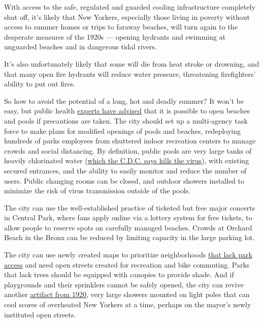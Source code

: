 With access to the safe, regulated and guarded cooling infrastructure
completely shut off, it's likely that New Yorkers, especially those
living in poverty without access to summer homes or trips to faraway
beaches, will turn again to the desperate measures of the 1920s ---
opening hydrants and swimming at unguarded beaches and in dangerous
tidal rivers.

It's also unfortunately likely that some will die from heat stroke or
drowning, and that many open fire hydrants will reduce water pressure,
threatening firefighters' ability to put out fires.

So how to avoid the potential of a long, hot and deadly summer? It won't
be easy, but public health
\href{https://thehill.com/policy/healthcare/496483-evidence-mounts-that-outside-is-safer-when-it-comes-to-covid-19}{experts
have advised} that it is possible to open beaches and pools if
precautions are taken. The city should set up a multi-agency task force
to make plans for modified openings of pools and beaches, redeploying
hundreds of parks employees from shuttered indoor recreation centers to
manage crowds and social distancing. By definition, public pools are
very large tanks of heavily chlorinated water
(\href{https://www.cdc.gov/coronavirus/2019-ncov/community/parks-rec/park-administrators.html}{which
the C.D.C. says kills the virus}), with existing secured entrances, and
the ability to easily monitor and reduce the number of users. Public
changing rooms can be closed, and outdoor showers installed to minimize
the risk of virus transmission outside of the pools.

The city can use the well-established practice of ticketed but free
major concerts in Central Park, where fans apply online via a lottery
system for free tickets, to allow people to reserve spots on carefully
managed beaches. Crowds at Orchard Beach in the Bronx can be reduced by
limiting capacity in the large parking lot.

The city can use newly created maps to prioritize neighborhoods
\href{https://www.arcgis.com/apps/webappviewer/index.html?id=4d082c62efb44e56b105366fb92335b3\&extent=-8287910.233\%2C4941135.2385\%2C-8185178.8669\%2C4998463.0097\%2C102100}{that
lack park access} and need open streets created for recreation and bike
commuting. Parks that lack trees should be equipped with canopies to
provide shade. And if playgrounds and their sprinklers cannot be safely
opened, the city can revive another
\href{http://nycma.lunaimaging.com/luna/servlet/detail/RECORDSPHOTOUNITARC~9~9~29533~104331:mrc_160?qvq=q:croton\%20surf\&mi=0\&trs=2}{artifact
from 1920,} very large showers mounted on light poles that can cool
scores of overheated New Yorkers at a time, perhaps on the mayor's newly
instituted open streets.

